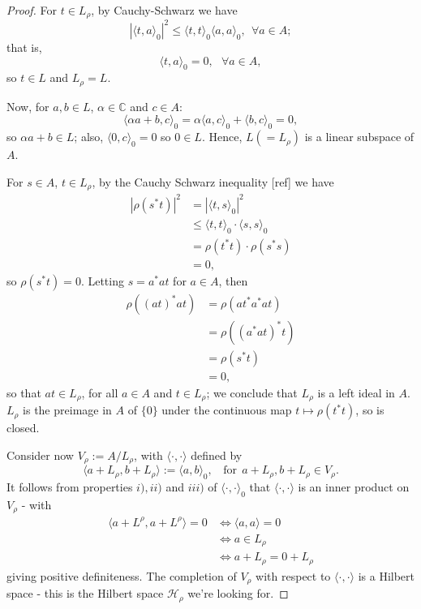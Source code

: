 \documentclass[12pt,a4paper]{amsart}
\theoremstyle{plain}
\theoremstyle{definition}
\newcommand{\Hr}{\mathcal{H}_\rho}
\newcommand{\1}{\mathbbm{1}}
\begin{document}
\begin{proof}
	For $t \in L_\rho$, by Cauchy-Schwarz we have 
	\[ 
		|\langle t,a \rangle_0|^2 \leq \langle t,t \rangle_0 \langle a,a\rangle_0,~~ \forall a \in A;
	\]
	that is,
	\[
		\langle t,a \rangle _0 = 0, ~~~ \forall a \in A,
	\]
	so $t\in L$ and $L_\rho =L$.
	
	Now, for $a,b \in L$, $\alpha \in \mathbb{C}$ and $c \in A$:
	\[
		\langle \alpha a + b, c \rangle _0 = \alpha \langle a,c \rangle _0 + \langle b,c\rangle _0 = 0,
	\]
	so $\alpha a +b \in L$; also, $\langle 0,c\rangle _0 = 0$ so $0 \in L$. 
	Hence, $L ( =L_\rho ) $ is a linear subspace of $A$.
	
	For $s \in A$, $t\in L_\rho$, by the Cauchy Schwarz inequality [ref] we have 
	\begin{align*}
		|\rho (s^\ast t) |^2 
		&= 		|\langle t,s\rangle_0 |^2 									\\
		&\leq 	\langle t,t\rangle_0 \cdot \langle s,s\rangle_0  			\\
		&= 		\rho (t^\ast t) \cdot \rho (s^\ast s)						\\
		&=		0,
	\end{align*}
	so $\rho (s^\ast t) = 0$. Letting $s = a^\ast a t$ for $a \in A$, then
	\begin{align*}
		\rho ((at)^\ast at) 
		&= 		\rho (at^\ast a^\ast at) 									\\
		&= 		\rho ((a^\ast at)^\ast t) 									\\
		&= 		\rho (s^\ast t) 											\\
		&=		0,
	\end{align*}
	so that $at \in L_\rho$, for all $a \in A$ and $t \in L_\rho$; 
	we conclude that $L_\rho$ is a left ideal in $A$.
	$L_\rho$ is  the preimage in $A$ of $\{0\}$ under the continuous map 
	$t \mapsto \rho (t^\ast t)$, so is closed.
	
	Consider now $V_\rho := A / L_\rho$, with $\langle \cdot,\cdot\rangle$ defined by 
	\[
		\langle a+L_\rho,b+L_\rho \rangle := \langle a,b\rangle_0, ~~~~ 
		\mbox{for}~~a+L_\rho,b+L_\rho \in V_\rho.
	\]
	It follows from properties $i),ii)$ and $iii)$ of $\langle \cdot,\cdot  \rangle _0$ that
	$\langle \cdot,\cdot  \rangle$ is an inner product on $V_\rho$ - with
	\begin{align*}
				\langle a + L^\rho, a + L^\rho \rangle = 0
		&\iff 	\langle a,a\rangle=0										\\
		&\iff 	a \in L_\rho												\\
		&\iff 	a+L_\rho = 0+L_\rho
	\end{align*}
	giving positive definiteness.
	The completion of $V_\rho$ with respect to $\langle \cdot,\cdot  \rangle$ is a Hilbert space -
	this is the Hilbert space $\Hr$ we're looking for.
	

\end{proof}
\end{document}
